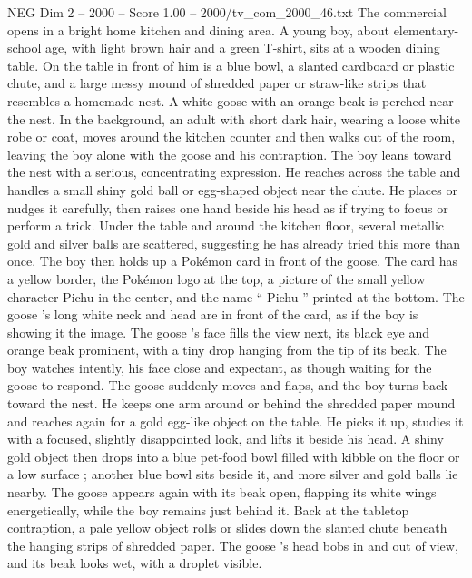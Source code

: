 \begin{textsample}{NEG Dim 2 – 2000 – Score 1.00 – 2000/tv\_com\_2000\_46.txt}  \label{ex:f2_neg_079}
The commercial opens in a bright home kitchen and dining area.
A young boy, about elementary-school age, with light brown hair and a green T-shirt, sits at a wooden dining table.
On the table in front of him is a blue bowl, a slanted cardboard or plastic chute, and a large messy mound of shredded paper or straw-like strips that resembles a homemade nest.
A white goose with an orange beak is perched near the nest.
In the background, an adult with short dark hair, wearing a loose white robe or coat, moves around the kitchen counter and then walks out of the room, leaving the boy alone with the goose and his contraption.
The boy leans toward the nest with a serious, concentrating expression.
He reaches across the table and handles a small shiny gold ball or egg-shaped object near the chute.
He places or nudges it carefully, then raises one hand beside his head as if trying to focus or perform a trick.
Under the table and around the kitchen floor, several metallic gold and silver balls are scattered, suggesting he has already tried this more than once.
The boy then holds up a Pokémon card in front of the goose.
The card has a yellow border, the Pokémon logo at the top, a picture of the small yellow character Pichu in the center, and the name “ Pichu ” printed at the bottom.
The goose ’s long white neck and head are in front of the card, as if the boy is showing it the image.
The goose ’s face fills the view next, its black eye and orange beak prominent, with a tiny drop hanging from the tip of its beak.
The boy watches intently, his face close and expectant, as though waiting for the goose to respond.
The goose suddenly moves and flaps, and the boy turns back toward the nest.
He keeps one arm around or behind the shredded paper mound and reaches again for a gold egg-like object on the table.
He picks it up, studies it with a focused, slightly disappointed look, and lifts it beside his head.
A shiny gold object then drops into a blue pet-food bowl filled with kibble on the floor or a low surface ; another blue bowl sits beside it, and more silver and gold balls lie nearby.
The goose appears again with its beak open, flapping its white wings energetically, while the boy remains just behind it.
Back at the tabletop contraption, a pale yellow object rolls or slides down the slanted chute beneath the hanging strips of shredded paper.
The goose ’s head bobs in and out of view, and its beak looks wet, with a droplet visible.

\end{textsample}
